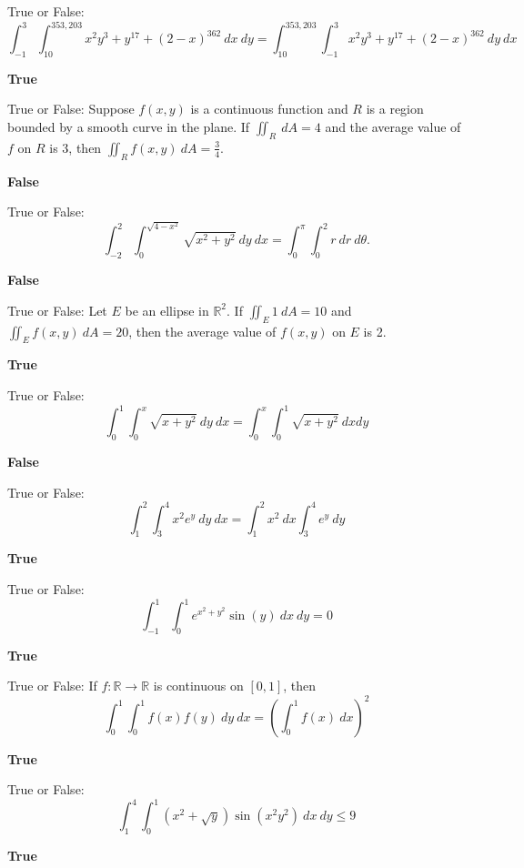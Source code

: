 \documentclass{exam}
\newcommand{\R}{\mathbb{R}}
\begin{document}
\begin{questions}
		\question True or False: \[ \int_{-1}^3 \int_{10}^{353,203} x^2y^3+y^{17}+(2-x)^{362}\ dx\ dy = \int_{10}^{353,203} \int_{-1}^3 x^2y^3+y^{17}+(2-x)^{362}\ dy\ dx \]
		\begin{solution}
			\textbf{True}
		\end{solution}
		
		\question True or False: Suppose $f(x,y)$ is a continuous function and $R$ is a region bounded by a smooth curve in the plane.  If $\iint_R\ dA = 4$ and the average value of $f$ on $R$ is $3$, then $\iint_R f(x,y)\ dA = \frac{3}{4}$.
		 \begin{solution}
		 	\textbf{False}
		 \end{solution}
		
		\question True or False: \[\int_{-2}^{2} \int_{0}^{\sqrt{4-x^2}} \sqrt{x^2+y^2}\ dy\ dx = \int_{0}^{\pi} \int_{0}^{2} r\ dr\ d\theta. \]
		\begin{solution}
			\textbf{False}
		\end{solution}
		
		\question True or False: Let $E$ be an ellipse in $\R^2$.  If $\iint_E 1\ dA=10$ and $\iint_E f(x,y)\ dA =20$, then the average value of $f(x,y)$ on $E$ is 2.
		 \begin{solution}
		 	\textbf{True}
		 \end{solution}
		
		\question True or False: \[ \int_0^1\int_0^x\sqrt{x+y^2}\ dy\ dx = \int_0^x\int_0^1\sqrt{x+y^2}\ dx dy\]
		\begin{solution}
			\textbf{False}
		\end{solution}
		
		\question True or False: \[\int_1^2\int_3^4 x^2e^y\ dy\ dx = \int_1^2 x^2\ dx \int_3^4 e^y\ dy \]
		\begin{solution}
			\textbf{True}
		\end{solution}
		
		\question True or False: \[\int_{-1}^1\int_0^1e^{x^2+y^2}\sin(y)\ dx\ dy=0\]
		\begin{solution}
			\textbf{True}
		\end{solution}
		
		\question True or False: If $f:\R\to\R$ is continuous on $[0,1]$, then \[\int_0^1\int_0^1 f(x)f(y)\ dy\ dx=\left( \int_0^1 f(x)\ dx \right)^2 \]
		\begin{solution}
			\textbf{True}
		\end{solution}
		
		\question True or False: \[ \int_1^4\int_0^1 (x^2+\sqrt{y})\sin(x^2y^2)\ dx\ dy \leq 9 \]
		\begin{solution}
			\textbf{True}
		\end{solution}
		

\end{questions}
\end{document}
